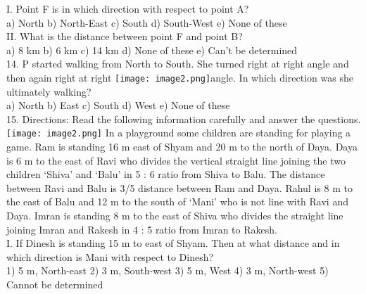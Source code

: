 \documentclass[
]{article}
\begin{document}
I. Point F is in which direction with respect to point A?\\
a) North \hspace{2mm}b) North-East \hspace{2mm}c) South
\hspace{2mm}d) South-West \hspace{2mm}e) None of these\\

II. What is the distance between point F and point B?\\
a) 8 km \hspace{2mm}b) 6 km \hspace{2mm}c) 14 km
\hspace{2mm}d) None of these \hspace{2mm}e) Can’t be determined\\

14. P started walking from North to South. She turned right at right angle and then again right at right \texttt{[image: image2.png]}angle. In which direction was she ultimately walking?\\
a) North \hspace{2mm}b) East \hspace{2mm}c) South \hspace{2mm}d) West \hspace{2mm}e) None of these\\

15. Directions: Read the following information carefully and answer the questions.\\
\texttt{[image: image2.png]}
In a playground some children are standing for playing a game. Ram is standing 16 m east
of Shyam and 20 m to the north of Daya. Daya is 6 m to the east of Ravi who divides the
vertical straight line joining the two children ‘Shiva’ and ‘Balu’ in 5 : 6 ratio from Shiva to
Balu. The distance between Ravi and Balu is 3/5 distance between Ram and Daya. Rahul is 8
m to the east of Balu and 12 m to the south of ‘Mani’ who is not line with Ravi and Daya.
Imran is standing 8 m to the east of Shiva who divides the straight line joining Imran and
Rakesh in 4 : 5 ratio from Imran to Rakesh.\\

I. If Dinesh is standing 15 m to east of Shyam. Then at what distance and in which direction is
Mani with respect to Dinesh?\\
1) 5 m, North-east \hspace{2mm}2) 3 m, South-west \hspace{2mm}3) 5 m, West \hspace{2mm}4) 3 m, North-west \hspace{2mm}5) Cannot be determined\\
\end{document}
